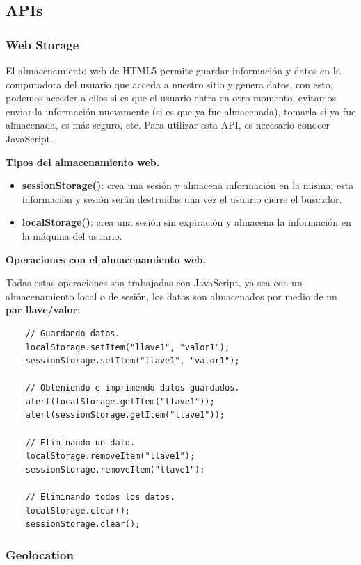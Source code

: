 \subsection{APIs}


\subsubsection{Web Storage}

El almacenamiento web de HTML5 permite guardar información y datos en la computadora del usuario que acceda a nuestro sitio y genera datos, con esto, podemos acceder a ellos si es que el usuario entra en otro momento, evitamos enviar la información nuevamente (si es que ya fue almacenada), tomarla si ya fue almacenada, es más seguro, etc. Para utilizar esta API, es necesario conocer JavaScript.

\textbf{Tipos del almacenamiento web.}

\begin{itemize}
    \item \textbf{sessionStorage()}: crea una sesión y almacena información en la misma; esta información y sesión serán destruidas una vez el usuario cierre el buscador.
    \item \textbf{localStorage()}: crea una sesión sin expiración y almacena la información en la máquina del usuario.
\end{itemize}

\textbf{Operaciones con el almacenamiento web.}

Todas estas operaciones son trabajadas con JavaScript, ya sea con un almacenamiento local o de sesión, los datos son almacenados por medio de un \textbf{par llave/valor}:
\begin{lstlisting}
    // Guardando datos.
    localStorage.setItem("llave1", "valor1");
    sessionStorage.setItem("llave1", "valor1");

    // Obteniendo e imprimendo datos guardados.
    alert(localStorage.getItem("llave1"));
    alert(sessionStorage.getItem("llave1"));

    // Eliminando un dato.
    localStorage.removeItem("llave1");
    sessionStorage.removeItem("llave1");

    // Eliminando todos los datos.
    localStorage.clear();
    sessionStorage.clear();
\end{lstlisting}


\subsubsection{Geolocation}

